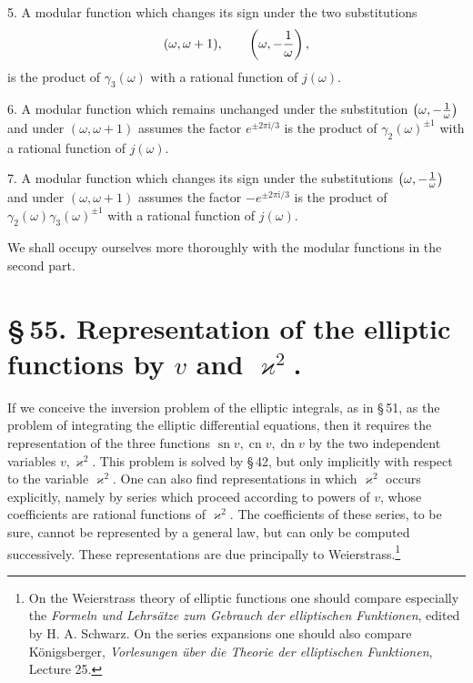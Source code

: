 \documentclass[11pt]{article}
\providecommand{\sn}{\operatorname{sn}}
\providecommand{\cn}{\operatorname{cn}}
\providecommand{\dn}{\operatorname{dn}}
\providecommand{\ii}{\mathrm{i}}
\begin{document}
5. A modular function which changes its sign under the two substitutions
\[
(\omega,\omega+1),
\qquad
\left(\omega,-{1\over\omega}\right),
\]
is the product of $\gamma_3(\omega)$ with a rational function of $j(\omega)$.

6. A modular function which remains unchanged under the substitution $\left(\omega,-{1\over\omega}\right)$ and under $(\omega,\omega+1)$ assumes the factor $e^{\pm 2\pi\ii/3}$ is the product of $\gamma_2(\omega)^{\pm1}$ with a rational function of $j(\omega)$.

7. A modular function which changes its sign under the substitutions $\left(\omega,-{1\over\omega}\right)$ and under $(\omega,\omega+1)$ assumes the factor $-e^{\pm 2\pi\ii/3}$ is the product of $\gamma_2(\omega)\gamma_3(\omega)^{\pm1}$ with a rational function of $j(\omega)$.

We shall occupy ourselves more thoroughly with the modular functions in the second part.

\section*{\S\,55. Representation of the elliptic functions by $v$ and $\varkappa^2$.}

If we conceive the inversion problem of the elliptic integrals, as in \S\,51, as the problem of integrating the elliptic differential equations, then it requires the representation of the three functions $\sn v,\cn v,\dn v$ by the two independent variables $v,\varkappa^2$. This problem is solved by \S\,42, but only implicitly with respect to the variable $\varkappa^2$. One can also find representations in which $\varkappa^2$ occurs explicitly, namely by series which proceed according to powers of $v$, whose coefficients are rational functions of $\varkappa^2$. The coefficients of these series, to be sure, cannot be represented by a general law, but can only be computed successively. These representations are due principally to Weierstrass.\footnote{On the Weierstrass theory of elliptic functions one should compare especially the \emph{Formeln und Lehrs\"atze zum Gebrauch der elliptischen Funktionen}, edited by H. A. Schwarz. On the series expansions one should also compare K\"onigsberger, \emph{Vorlesungen \"uber die Theorie der elliptischen Funktionen}, Lecture 25.}
\end{document}

